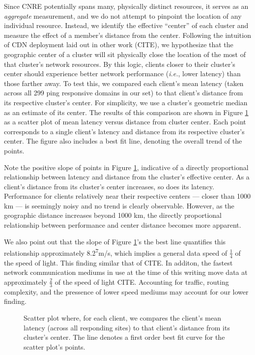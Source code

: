 Since CNRE potentially spans many, physically distinct resources, it serves as
an \emph{aggregate} measurement, and we do not attempt to pinpoint the location
of any individual resource. Instead, we identify the effective ``center'' of
each cluster and measure the effect of a member's distance from the center.
Following the intuition of CDN deployment laid out in other work (CITE), we
hypothesize that the geographic center of a cluster will sit physically close
the location of the most of that cluster's network resources. By this logic,
clients closer to their cluster's center should experience better network
performance (\emph{i.e.}, lower latency) than those farther away. To test this,
we compared each client's mean latency (taken across all 299 ping responsive domains
in our set) to that client's distance from its respective cluster's center. For
simplicity, we use a cluster's geometric median as an estimate of its center.
The results of this comparison are shown in Figure \ref{geoperf} as a scatter
plot of mean latency versus distance from cluster center. Each point corresponds
to a single client's latency and distance from its respective cluster's center.
The figure also includes a best fit line, denoting the overall trend of the
points. 

Note the positive slope of points in Figure \ref{geoperf}, indicative of a
directly proportional relationship between latency and distance from the
cluster's effective center. As a client's distance from its cluster's center
increases, so does its latency. Performance for clients relatively near their
respective centers --- closer than 1000 km --- is seemingly noisy and no trend
is clearly observable.  However, as the geographic distance increases beyond
1000 km, the directly proportional relationship between performance and center
distance becomes more apparent. 

We also point out that the slope of Figure \ref{geoperf}'s the
best line quantifies this relationship approximately
8.2\textsuperscript{7}m/s, which implies a general data speed of
$\frac{1}{4}$ of the speed of light. This finding similar that of CITE. In additon, the
fastest network communication mediums in use at the time of this writing move
data at approximately $\frac{2}{3}$ of the speed of light CITE. Accounting for
traffic, routing complexity, and the pressence of lower speed mediums may
account for our lower finding.

\begin{figure}
    \caption{Scatter plot where, for each client, we compares the client's mean latency
    (across all responding sites) to that client's distance from its cluster's
    center. The line denotes a first order best fit curve for the scatter plot's points.}
    \label{geoperf}
\end{figure}
